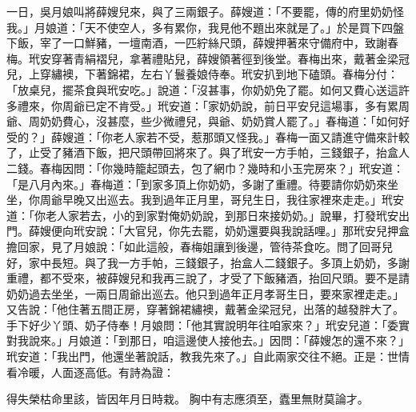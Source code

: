 一日，吳月娘叫將薛嫂兒來，與了三兩銀子。薛嫂道：「不要罷，傳的府里奶奶怪我。」月娘道：「天不使空人，多有累你，我見他不題出來就是了。」於是買下四盤下飯，宰了一口鮮豬，一壇南酒，一匹紵絲尺頭，薛嫂押著來守備府中，致謝春梅。玳安穿著青絹褶兒，拿著禮貼兒，薛嫂領著徑到後堂。春梅出來，戴著金梁冠兒，上穿繡襖，下著錦裙，左右丫鬟養娘侍奉。玳安扒到地下磕頭。春梅分付：「放桌兒，擺茶食與玳安吃。」說道：「沒甚事，你奶奶免了罷。如何又費心送這許多禮來，你周爺已定不肯受。」玳安道：「家奶奶說，前日平安兒這場事，多有累周爺、周奶奶費心，沒甚麼，些少微禮兒，與爺、奶奶賞人罷了。」春梅道：「如何好受的？」薛嫂道：「你老人家若不受，惹那頭又怪我。」春梅一面又請進守備來計較了，止受了豬酒下飯，把尺頭帶回將來了。與了玳安一方手帕，三錢銀子，抬盒人二錢。春梅因問：「你幾時籠起頭去，包了網巾？幾時和小玉完房來？」玳安道：「是八月內來。」春梅道：「到家多頂上你奶奶，多謝了重禮。待要請你奶奶來坐坐，你周爺早晚又出巡去。我到過年正月里，哥兒生日，我往家裡來走走。」玳安道：「你老人家若去，小的到家對俺奶奶說，到那日來接奶奶。」說畢，打發玳安出門。薛嫂便向玳安說：「大官兒，你先去罷，奶奶還要與我說話哩。」那玳安兒押盒擔回家，見了月娘說：「如此這般，春梅姐讓到後邊，管待茶食吃。問了回哥兒好，家中長短。與了我一方手帕，三錢銀子，抬盒人二錢銀子。多頂上奶奶，多謝重禮，都不受來，被薛嫂兒和我再三說了，才受了下飯豬酒，抬回尺頭。要不是請奶奶過去坐坐，一兩日周爺出巡去。他只到過年正月孝哥生日，要來家裡走走。」又告說：「他住著五間正房，穿著錦裙繡襖，戴著金梁冠兒，出落的越發胖大了。手下好少丫頭、奶子侍奉！月娘問：「他其實說明年往咱家來？」玳安兒道：「委實對我說來。」月娘道：「到那日，咱這邊使人接他去。」因問：「薛嫂怎的還不來？」玳安道：「我出門，他還坐著說話，教我先來了。」自此兩家交往不絕。正是：世情看冷暖，人面逐高低。有詩為證：

得失榮枯命里該，皆因年月日時栽。
胸中有志應須至，蠹里無財莫論才。

